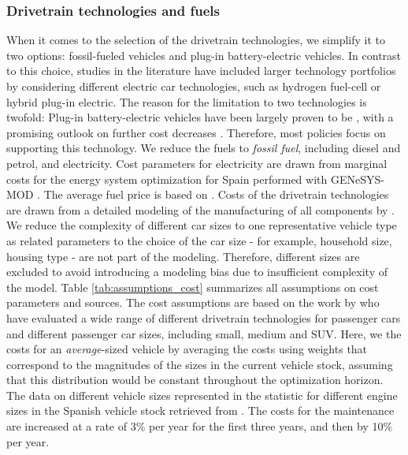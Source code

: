                 



 \subsubsection{Drive\deleted{-}train technologies and fuels}
        
            When it comes to the selection of the drive\deleted{-}train technologies, we simplify it to two options: fossil-fueled vehicles and plug-in battery-electric vehicles. In contrast to this choice, studies in the literature have included larger technology portfolios by considering different electric car technologies, such as hydrogen fuel-cell or hybrid plug-in electric. The reason for the limitation to two technologies is twofold: Plug-in battery-electric vehicles have been largely proven to be , with a promising outlook on further cost decreases \citep{GRUBE2021103110}. Therefore, most policies focus on supporting this technology. We reduce the fuels to \textit{fossil fuel}, including diesel and petrol, and electricity. Cost parameters for electricity are drawn from marginal costs for the energy system optimization for Spain performed with GENeSYS-MOD \citep{loffler2025european}. The average fuel price is based on \citep{MARTIN2023113637}. 
            Costs of the drivetrain technologies are drawn from a detailed modeling of the manufacturing of all components by \citep{GRUBE2021103110}. We reduce the complexity of different car sizes to one representative vehicle type as related parameters to the choice of the car size - for example, household size, housing type \citep{jia2023preferences} - are not part of the modeling. Therefore, different sizes are excluded to avoid introducing a modeling bias due to insufficient complexity of the model. Table \ref{tab:assumptions_cost} summarizes all assumptions on cost parameters and sources. The cost assumptions are based on the work by \citet{GRUBE2021103110}  who have evaluated a wide range of different drivetrain technologies for passenger cars and different passenger car sizes, including small, medium\added{,} and SUV. Here, we  the costs for an \textit{average}-sized vehicle by averaging the costs using weights that correspond to the magnitudes of the sizes in the current vehicle stock, assuming that this distribution would be constant throughout the optimization horizon. The data on different vehicle sizes represented in the statistic for different engine sizes in the Spanish vehicle stock  retrieved from \citep{dgt2023}. 
            The costs for the maintenance are increased at a rate of 3\% per year for the first three years, and then by 10\% per year.
            

